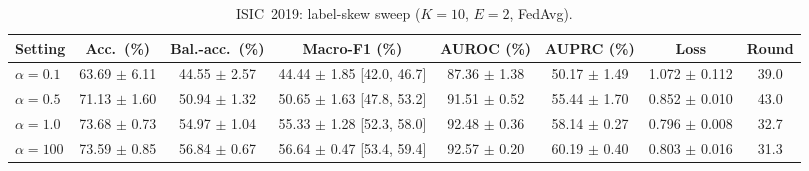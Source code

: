 \begin{table}[!t]
\caption{ISIC~2019: label-skew sweep ($K{=}10$, $E{=}2$, FedAvg).}
\label{tab:19-partition}
\centering
\footnotesize
\begin{tabular}{lccccccc}
\toprule
Setting & Acc.\ (\%) & Bal.-acc.\ (\%) & Macro-F1 (\%) & AUROC (\%) & AUPRC (\%) & Loss & Round \\
\midrule
$\alpha=0.1$ & 63.69 $\pm$ 6.11 & 44.55 $\pm$ 2.57 & 44.44 $\pm$ 1.85 [42.0, 46.7] & 87.36 $\pm$ 1.38 & 50.17 $\pm$ 1.49 & 1.072 $\pm$ 0.112 & 39.0 \\
$\alpha=0.5$ & 71.13 $\pm$ 1.60 & 50.94 $\pm$ 1.32 & 50.65 $\pm$ 1.63 [47.8, 53.2] & 91.51 $\pm$ 0.52 & 55.44 $\pm$ 1.70 & 0.852 $\pm$ 0.010 & 43.0 \\
$\alpha=1.0$ & 73.68 $\pm$ 0.73 & 54.97 $\pm$ 1.04 & 55.33 $\pm$ 1.28 [52.3, 58.0] & 92.48 $\pm$ 0.36 & 58.14 $\pm$ 0.27 & 0.796 $\pm$ 0.008 & 32.7 \\
$\alpha=100$ & 73.59 $\pm$ 0.85 & 56.84 $\pm$ 0.67 & 56.64 $\pm$ 0.47 [53.4, 59.4] & 92.57 $\pm$ 0.20 & 60.19 $\pm$ 0.40 & 0.803 $\pm$ 0.016 & 31.3 \\
\bottomrule
\end{tabular}
\end{table}